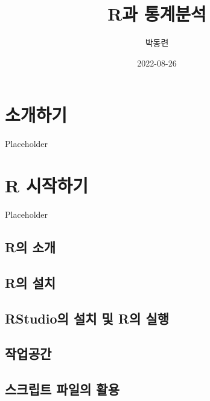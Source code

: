 \documentclass[
]{book}
\title{R과 통계분석}
\author{박동련}
\date{2022-08-26}
\begin{document}
\maketitle

{
\setcounter{tocdepth}{1}
\tableofcontents
}
\hypertarget{uxc18cuxac1cuxd558uxae30}{%
\chapter*{소개하기}\label{uxc18cuxac1cuxd558uxae30}}

Placeholder

\hypertarget{r-uxc2dcuxc791uxd558uxae30}{%
\chapter{R 시작하기}\label{r-uxc2dcuxc791uxd558uxae30}}

Placeholder

\hypertarget{ruxc758-uxc18cuxac1c}{%
\section{R의 소개}\label{ruxc758-uxc18cuxac1c}}

\hypertarget{ruxc758-uxc124uxce58}{%
\section{R의 설치}\label{ruxc758-uxc124uxce58}}

\hypertarget{rstudiouxc758-uxc124uxce58-uxbc0f-ruxc758-uxc2e4uxd589}{%
\section{RStudio의 설치 및 R의 실행}\label{rstudiouxc758-uxc124uxce58-uxbc0f-ruxc758-uxc2e4uxd589}}

\hypertarget{uxc791uxc5c5uxacf5uxac04}{%
\section{작업공간}\label{uxc791uxc5c5uxacf5uxac04}}

\hypertarget{uxc2a4uxd06cuxb9bduxd2b8-uxd30cuxc77cuxc758-uxd65cuxc6a9}{%
\section{스크립트 파일의 활용}\label{uxc2a4uxd06cuxb9bduxd2b8-uxd30cuxc77cuxc758-uxd65cuxc6a9}}
\end{document}
